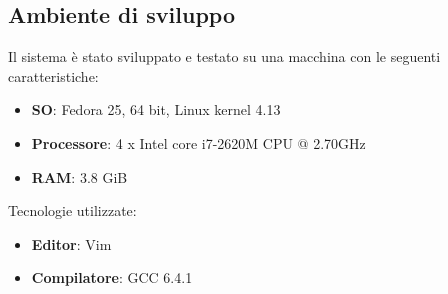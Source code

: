 \subsection{Ambiente di sviluppo}
Il sistema è stato sviluppato e testato su una macchina con le seguenti
caratteristiche:
\begin{itemize}
\item \textbf{SO}: Fedora 25, 64 bit, Linux kernel 4.13
\item \textbf{Processore}: 4 x Intel core i7-2620M CPU @ 2.70GHz
\item \textbf{RAM}: 3.8 GiB 
\end{itemize}
Tecnologie utilizzate:
\begin{itemize}
\item \textbf{Editor}: Vim 
\item \textbf{Compilatore}: GCC 6.4.1 
\end{itemize}

